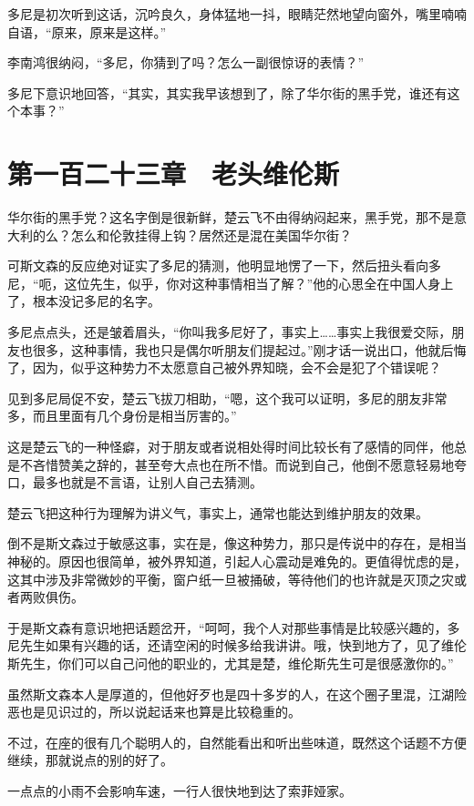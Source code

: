 多尼是初次听到这话，沉吟良久，身体猛地一抖，眼睛茫然地望向窗外，嘴里喃喃自语，“原来，原来是这样。”

李南鸿很纳闷，“多尼，你猜到了吗？怎么一副很惊讶的表情？”

多尼下意识地回答，“其实，其实我早该想到了，除了华尔街的黑手党，谁还有这个本事？”

\section{第一百二十三章　老头维伦斯}

华尔街的黑手党？这名字倒是很新鲜，楚云飞不由得纳闷起来，黑手党，那不是意大利的么？怎么和伦敦挂得上钩？居然还是混在美国华尔街？

可斯文森的反应绝对证实了多尼的猜测，他明显地愣了一下，然后扭头看向多尼，“呃，这位先生，似乎，你对这种事情相当了解？”他的心思全在中国人身上了，根本没记多尼的名字。

多尼点点头，还是皱着眉头，“你叫我多尼好了，事实上……事实上我很爱交际，朋友也很多，这种事情，我也只是偶尔听朋友们提起过。”刚才话一说出口，他就后悔了，因为，似乎这种势力不太愿意自己被外界知晓，会不会是犯了个错误呢？

见到多尼局促不安，楚云飞拔刀相助，“嗯，这个我可以证明，多尼的朋友非常多，而且里面有几个身份是相当厉害的。”

这是楚云飞的一种怪癖，对于朋友或者说相处得时间比较长有了感情的同伴，他总是不吝惜赞美之辞的，甚至夸大点也在所不惜。而说到自己，他倒不愿意轻易地夸口，最多也就是不言语，让别人自己去猜测。

楚云飞把这种行为理解为讲义气，事实上，通常也能达到维护朋友的效果。

倒不是斯文森过于敏感这事，实在是，像这种势力，那只是传说中的存在，是相当神秘的。原因也很简单，被外界知道，引起人心震动是难免的。更值得忧虑的是，这其中涉及非常微妙的平衡，窗户纸一旦被捅破，等待他们的也许就是灭顶之灾或者两败俱伤。

于是斯文森有意识地把话题岔开，“呵呵，我个人对那些事情是比较感兴趣的，多尼先生如果有兴趣的话，还请空闲的时候多给我讲讲。哦，快到地方了，见了维伦斯先生，你们可以自己问他的职业的，尤其是楚，维伦斯先生可是很感激你的。”

虽然斯文森本人是厚道的，但他好歹也是四十多岁的人，在这个圈子里混，江湖险恶也是见识过的，所以说起话来也算是比较稳重的。

不过，在座的很有几个聪明人的，自然能看出和听出些味道，既然这个话题不方便继续，那就说点的别的好了。

一点点的小雨不会影响车速，一行人很快地到达了索菲娅家。


